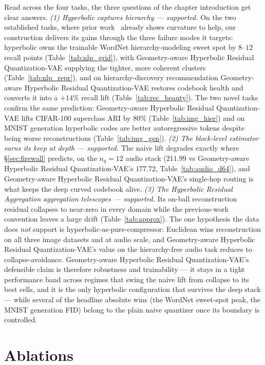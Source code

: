 \documentclass[12pt]{report}
\begin{document}
Read across the four tasks, the three questions of the chapter introduction get clear answers. \emph{(1) Hyperbolic captures hierarchy --- supported.} On the two established tasks, where prior work~\cite{hrqvae} already shows curvature to help, our construction delivers its gains through the three failure modes it targets: hyperbolic owns the trainable WordNet hierarchy-modeling sweet spot by $8$--$12$ recall points (Table~\ref{tab:nlp_grid}), with Geometry-aware Hyperbolic Residual Quantization-VAE supplying the tighter, more coherent clusters (Table~\ref{tab:nlp_repr}), and on hierarchy-discovery recommendation Geometry-aware Hyperbolic Residual Quantization-VAE restores codebook health and converts it into a $+14\%$ recall lift (Table~\ref{tab:rec_beauty}). The two novel tasks confirm the same prediction: Geometry-aware Hyperbolic Residual Quantization-VAE lifts CIFAR-100 superclass ARI by $80\%$ (Table~\ref{tab:img_hier}) and on MNIST generation hyperbolic codes are better autoregressive tokens despite being worse reconstructions (Table~\ref{tab:img_gen}). \emph{(2) The block-level estimator earns its keep at depth --- supported.} The naive lift degrades exactly where \S\ref{sec:firewall} predicts, on the $n_q=12$ audio stack ($211.99$ vs Geometry-aware Hyperbolic Residual Quantization-VAE's $177.72$, Table~\ref{tab:audio_d64}), and Geometry-aware Hyperbolic Residual Quantization-VAE's single-hop routing is what keeps the deep curved codebook alive. \emph{(3) The Hyperbolic Residual Aggregation aggregation telescopes --- supported.} Its on-ball reconstruction residual collapses to near-zero in every domain while the previous-work convention leaves a large drift (Table~\ref{tab:approx}). The one hypothesis the data does \emph{not} support is hyperbolic-as-pure-compressor: Euclidean wins reconstruction on all three image datasets and at audio scale, and Geometry-aware Hyperbolic Residual Quantization-VAE's value on the hierarchy-free audio task reduces to collapse-avoidance. Geometry-aware Hyperbolic Residual Quantization-VAE's defensible claim is therefore robustness and trainability --- it stays in a tight performance band across regimes that swing the naive lift from collapse to its best cells, and it is the only hyperbolic configuration that survives the deep stack --- while several of the headline absolute wins (the WordNet sweet-spot peak, the MNIST generation FID) belong to the plain naive quantizer once its boundary is controlled.

\chapter{Ablations}
\label{ch:ablation}
\end{document}
